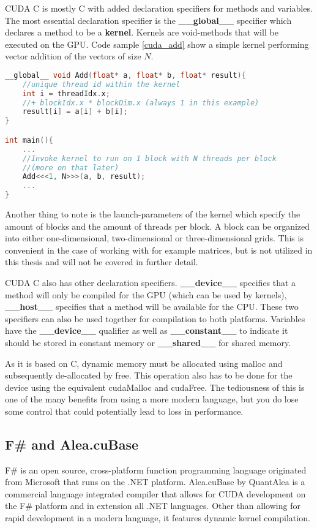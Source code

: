 CUDA C is mostly C with added declaration specifiers for methods and variables. The most essential declaration specifier is the \textbf{\_\_global\_\_} specifier which declares a method to be a \textbf{kernel}. Kernels are void-methods that will be executed on the GPU. Code sample \ref{cuda_add} show a simple kernel performing vector addition of the vectors of size $N$.

\begin{lstlisting}[language=C++, caption=CUDA C addition kernel, label=cuda_add]
__global__ void Add(float* a, float* b, float* result){
	//unique thread id within the kernel
	int i = threadIdx.x;
	//+ blockIdx.x * blockDim.x (always 1 in this example)
	result[i] = a[i] + b[i];
}

int main(){
	...
	//Invoke kernel to run on 1 block with N threads per block
	//(more on that later)
	Add<<<1, N>>>(a, b, result);
	...
}
\end{lstlisting}

Another thing to note is the launch-parameters of the kernel which specify the amount of blocks and the amount of threads per block. A block can be organized into either one-dimensional, two-dimensional or three-dimensional grids. This is convenient in the case of working with for example matrices, but is not utilized in this thesis and will not be covered in further detail.

CUDA C also has other declaration specifiers. \textbf{\_\_device\_\_} specifies that a method will only be compiled for the GPU (which can be used by kernels), \textbf{\_\_host\_\_} specifies that a method will be available for the CPU. These two specifiers can also be used together for compilation to both platforms.
Variables have the \textbf{\_\_device\_\_} qualifier as well as \textbf{\_\_constant\_\_} to indicate it should be stored in constant memory or \textbf{\_\_shared\_\_} for shared memory.

As it is based on C, dynamic memory must be allocated using malloc and subsequently de-allocated by free.
This operation also has to be done for the device using the equivalent cudaMalloc and cudaFree.
The tediousness of this is one of the many benefits from using a more modern language, but you do lose some control that could potentially lead to loss in performance.

\subsection{F\# and Alea.cuBase}
F\#\cite{fsharp} is an open source, cross-platform function programming language originated from Microsoft that runs on the .NET platform.
Alea.cuBase by QuantAlea\cite{quantalea} is a commercial language integrated compiler that allows for CUDA development on the F\# platform and in extension all .NET languages.
Other than allowing for rapid development in a modern language, it features dynamic kernel compilation.

